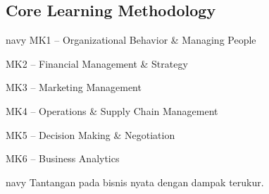 \subsection{Core Learning Methodology}
\begin{tcbraster}[raster columns=2,raster equal height=rows,raster column skip=3mm]
\begin{infobox}{navy}
MK1 -- Organizational Behavior \& Managing People\par MK2 -- Financial Management \& Strategy\par
MK3 -- Marketing Management\par MK4 -- Operations \& Supply Chain Management\par
MK5 -- Decision Making \& Negotiation\par MK6 -- Business Analytics
\end{infobox}
\begin{infobox}{navy}
Tantangan pada bisnis nyata dengan dampak terukur.
\end{infobox}
\end{tcbraster}

